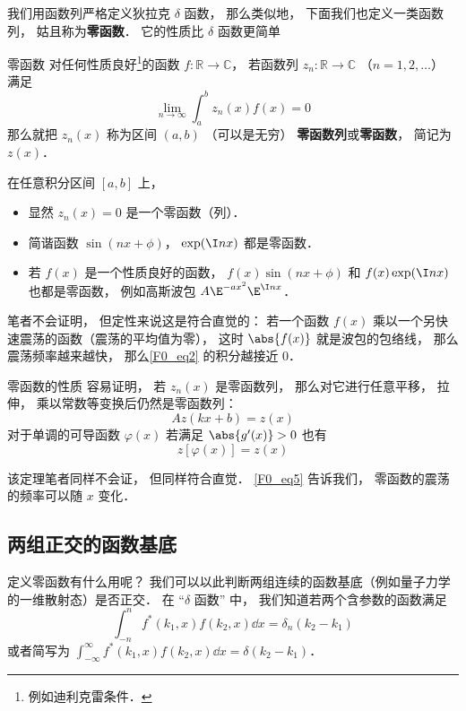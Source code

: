 
我们用函数列严格定义狄拉克 $\delta$ 函数， 那么类似地， 下面我们也定义一类函数列， 姑且称为\textbf{零函数}． 它的性质比 $\delta$ 函数更简单
\begin{definition}{零函数}
对任何性质良好\footnote{例如迪利克雷条件．}的函数 $f: \mathbb R \to \mathbb C$， 若函数列 $z_n: \mathbb R \to \mathbb C$ （$n = 1, 2, \dots$） 满足
\begin{equation}\label{F0_eq2}
\lim_{n\to \infty}\int_{a}^{b} z_n(x) f(x) = 0
\end{equation}
那么就把 $z_n(x)$ 称为区间 $(a,b)$ （可以是无穷） \textbf{零函数列}或\textbf{零函数}， 简记为 $z(x)$．
\end{definition}

\begin{example}{}\label{F0_ex1}
在任意积分区间 $[a,b]$ 上，
\begin{itemize}
\item 显然 $z_n(x) = 0$ 是一个零函数（列）．
\item 简谐函数 $\sin(nx + \phi)$， $\exp(\I n x)$ 都是零函数．
\item 若 $f(x)$ 是一个性质良好的函数， $f(x)\sin(nx + \phi)$ 和 $f(x)\exp(\I n x)$ 也都是零函数， 例如高斯波包 $A\E^{-ax^2}\E^{\I nx}$．
\end{itemize}

笔者不会证明， 但定性来说这是符合直觉的： 若一个函数 $f(x)$ 乘以一个另快速震荡的函数（震荡的平均值为零）， 这时 $\abs{f(x)}$ 就是波包的包络线， 那么震荡频率越来越快， 那么\autoref{F0_eq2} 的积分越接近 $0$．
\end{example}

\begin{theorem}{零函数的性质}
容易证明， 若 $z_n(x)$ 是零函数列， 那么对它进行任意平移， 拉伸， 乘以常数等变换后仍然是零函数列：
\begin{equation}
A z(kx + b) = z(x)
\end{equation}
对于单调的可导函数 $\varphi(x)$ 若满足 $\abs{g'(x)} > 0$ 也有
\begin{equation}\label{F0_eq5}
z[\varphi(x)] = z(x)
\end{equation}
\end{theorem}
该定理笔者同样不会证， 但同样符合直觉． \autoref{F0_eq5} 告诉我们， 零函数的震荡的频率可以随 $x$ 变化．

\subsection{两组正交的函数基底}
定义零函数有什么用呢？ 我们可以以此判断两组连续的函数基底（例如量子力学的一维散射态）是否正交． 在 “$\delta$ 函数” 中， 我们知道若两个含参数的函数满足
\begin{equation}\label{F0_eq1}
\int_{-n}^{n} f^*(k_1, x) f(k_2, x)\dd{x} = \delta_n(k_2 - k_1)
\end{equation}
或者简写为 $\int_{-\infty}^{\infty} f^*(k_1, x) f(k_2, x)\dd{x} = \delta(k_2 - k_1)$．

